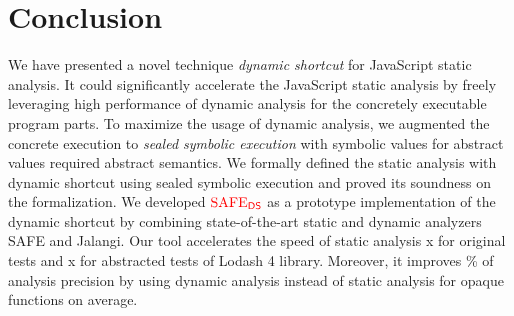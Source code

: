 \section{Conclusion}\label{sec:conclusion}

We have presented a novel technique \textit{dynamic shortcut} for JavaScript
static analysis.  It could significantly accelerate the JavaScript static
analysis by freely leveraging high performance of dynamic analysis for the
concretely executable program parts.  To maximize the usage of dynamic analysis,
we augmented the concrete execution to \textit{sealed symbolic execution} with
symbolic values for abstract values required abstract semantics.  We formally
defined the static analysis with dynamic shortcut using sealed symbolic execution
and proved its soundness on the formalization.  We developed ${\color{red}{\text{SAFE}_{\textsf{DS}}}}$ as a
prototype implementation of the dynamic shortcut by combining state-of-the-art
static and dynamic analyzers SAFE and Jalangi.  Our tool accelerates the speed
of static analysis x for original tests and x for
abstracted tests of Lodash 4 library.  Moreover, it improves \% of
analysis precision by using dynamic analysis instead of static analysis for
 opaque functions on average.
